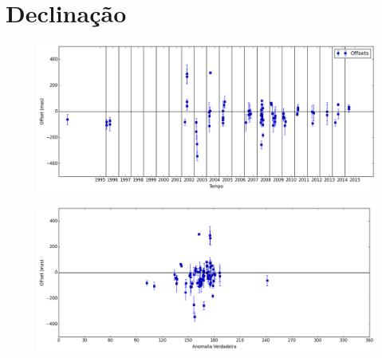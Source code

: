 \documentclass[11pt,a4paper]{report}
\begin{document}

\section*{Declinação}

\begin{figure}[h]
\includegraphics[scale=0.45]{Nereida/DEC.png} 
\end{figure}

\begin{figure}[h]
\includegraphics[scale=0.45]{Nereida/DEC_anom.png}  
\end{figure}
\end{document}

